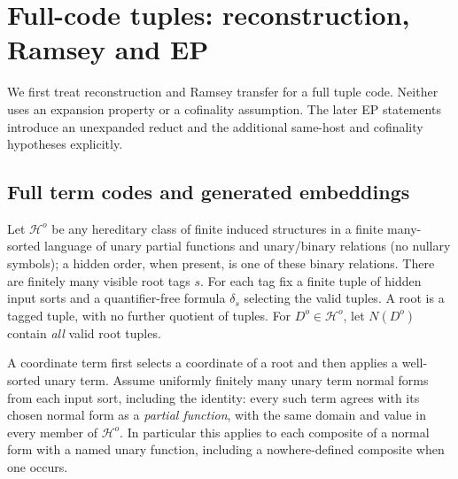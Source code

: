 \section{Full-code tuples: reconstruction, Ramsey and EP}
\label{sec:cofinal-fullcode-ep}

We first treat reconstruction and Ramsey transfer for a full tuple code.
Neither uses an expansion property or a cofinality assumption. The later
EP statements introduce an unexpanded reduct and the additional same-host
and cofinality hypotheses explicitly.

\subsection{Full term codes and generated embeddings}

Let $\mathcal H^o$ be any hereditary class of finite induced structures
in a finite many-sorted language of unary partial functions and unary/binary relations
(no nullary symbols); a hidden order, when present, is one of these binary
relations. There are finitely many visible root tags $s$. For each tag fix
a finite tuple of hidden input sorts and a quantifier-free formula
$\delta_s$ selecting the valid tuples. A root is a tagged tuple, with no
further quotient of tuples. For $D^o\in\mathcal H^o$, let $N(D^o)$ contain
\emph{all} valid root tuples.

A coordinate term first selects a coordinate of a root and then applies
a well-sorted unary term. Assume uniformly finitely many unary term normal
forms from each input sort, including the identity: every such term agrees
with its chosen normal form as a \emph{partial function}, with the same
domain and value in every member of $\mathcal H^o$. In particular this
applies to each composite of a normal form with a named unary function,
including a nowhere-defined composite when one occurs.

